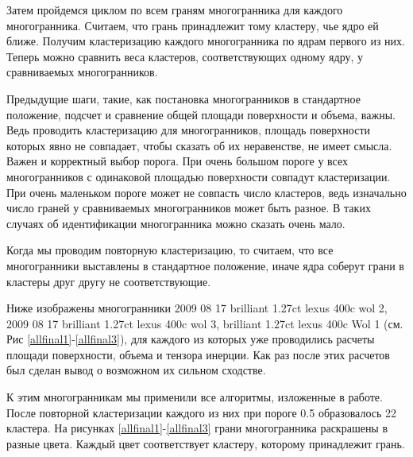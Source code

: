 \documentclass[a4paper,12pt, titlepage]{article}
\begin{document}
Затем пройдемся циклом по всем граням многогранника для каждого многогранника. 
Считаем, что грань принадлежит тому кластеру, чье ядро ей ближе. Получим кластеризацию каждого многогранника по ядрам 
первого из них. Теперь можно сравнить веса кластеров, соответствующих одному ядру, у сравниваемых многогранников. 

Предыдущие шаги, такие, как постановка многогранников в стандартное положение, подсчет и сравнение общей площади поверхности 
и объема, важны.
Ведь проводить кластеризацию для многогранников, площадь поверхности которых явно не совпадает, чтобы сказать об их
неравенстве, не имеет смысла.
Важен и корректный выбор порога. При очень большом  пороге у всех многогранников с 
одинаковой площадью поверхности совпадут кластеризации. 
При очень маленьком пороге может не совпасть число кластеров, ведь изначально число граней 
у сравниваемых многогранников может быть разное.  В таких случаях об идентификации многогранника можно сказать очень мало.

Когда мы проводим повторную кластеризацию, то считаем, что все многогранники выставлены в стандартное положение, 
иначе ядра соберут грани в кластеры друг другу не соответствующие.

Ниже изображены многогранники  2009 08 17 brilliant 1.27ct lexus 400c wol 2, 
2009 08 17 brilliant 1.27ct lexus 400c wol 3, brilliant 1.27ct lexus 400c Wol 1 (см. Рис \ref{allfinal1}-\ref{allfinal3}), 
для каждого из которых уже проводились 
расчеты площади поверхности, объема и тензора инерции. Как раз после этих расчетов был сделан вывод о возможном их
сильном сходстве.

К этим многогранникам мы применили все алгоритмы, изложенные в работе. После повторной кластеризации каждого из них
при пороге 0.5 образовалось 22 кластера. На рисунках \ref{allfinal1}-\ref{allfinal3} грани многогранника раскрашены 
в разные цвета. Каждый цвет соответствует кластеру, которому принадлежит грань.
\end{document}
